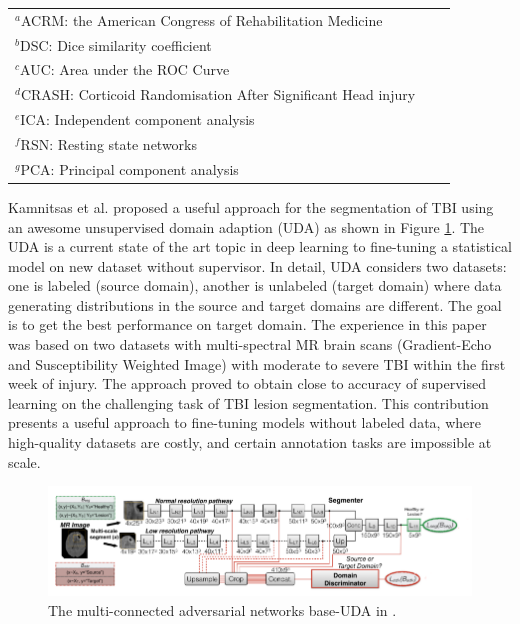 \documentclass[runningheads]{llncs}
\begin{document}
\begin{table}[]
{\begin{tabular}{p{2cm}@{\hskip 0.3in}p{4cm}@{\hskip 0.3in}p{4cm}@{\hskip 0.3in}p{3cm}@{\hskip 0.3in}p{3.5cm}}
\hline 
\multicolumn{3}{l}{$^{a}$\footnotesize{ACRM: the American Congress of Rehabilitation Medicine}} \\
\multicolumn{3}{l}{$^{b}$\footnotesize{DSC: Dice similarity coefficient}} \\
\multicolumn{3}{l}{$^{c}$\footnotesize{AUC: Area under the ROC Curve}} \\
\multicolumn{3}{l}{$^{d}$\footnotesize{CRASH: Corticoid Randomisation After Significant Head injury }}\\
\multicolumn{3}{l}{$^{e}$\footnotesize{ICA: Independent component analysis}}\\
\multicolumn{3}{l}{$^{f}$\footnotesize{RSN: Resting state networks}}\\
\multicolumn{3}{l}{$^{g}$\footnotesize{PCA: Principal component analysis}}\\
\end{tabular}}
\label{tab:sumofiden}
\end{table}


Kamnitsas et al. \cite{kamnitsas_unsupervised_2017} proposed a useful approach for the segmentation of TBI using an awesome unsupervised domain adaption (UDA) as shown in Figure \ref{fig:uda}. The UDA is a current state of the art topic in deep learning to fine-tuning a statistical model on new dataset without supervisor. In detail, UDA considers two datasets: one is labeled (source domain), another is unlabeled (target domain) where data generating distributions in the source and target domains are different. The goal is  to get the best performance on target domain. The experience in this paper was based on two datasets with multi-spectral MR brain scans (Gradient-Echo and Susceptibility Weighted Image) with moderate to severe TBI within the first week of injury. The approach proved to obtain close to accuracy of supervised learning on the challenging task of TBI lesion segmentation. This contribution presents a useful approach to fine-tuning models without labeled data, where high-quality datasets are costly, and certain annotation tasks are impossible at scale.

\begin{figure}[]
\centering
\includegraphics[width=15cm]{imgs/kamnitsas_2017_pipeline.png}
\caption{The multi-connected adversarial networks base-UDA in \cite{kamnitsas_unsupervised_2017}.}
\label{fig:uda}
\end{figure}
\end{document}
